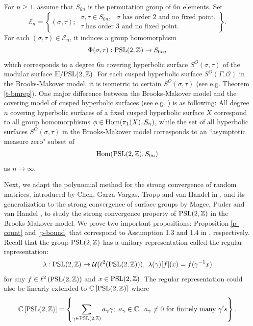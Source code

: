 \documentclass{amsart}
\theoremstyle{plain}
\theoremstyle{definition}
\theoremstyle{remark}
\begin{document}
For $n\geq 1$, assume that $S_{6n}$ is the permutation group of $6n$ elements. Set
$$\mathcal{E}_n=\left\{(\sigma,\tau);\ \begin{matrix}\sigma,\tau\in S_{6n},\text{ $\sigma$ has order $2$ and no fixed point,}\\ \text{$\tau$ has order $3$ and no fixed point}.\end{matrix}\right\}.$$
For each $(\sigma,\tau)\in\mathcal{E}_n$, it induces a group homomorphism
$$\Phi(\sigma,\tau):\textnormal{PSL}(2,\mathbb{Z})\to S_{6n},$$
which corresponds to a degree $6n$ covering hyperbolic surface $S^O(\sigma,\tau)$ of the modular surface $\mathbb{H}/\textnormal{PSL}(2,\mathbb{Z})$. For each cusped hyperbolic surface $S^O(\Gamma,\mathcal{O})$ in the Brooks-Makover model, it is isometric to certain $S^O(\sigma,\tau)$ (see e.g. Theorem \ref{t-bmrep}). One major difference between the Brooks-Makover model and the covering model of cusped hyperbolic surfaces (see e.g. \cite{HM23}) is as following: All degree $n$ covering hyperbolic surfaces of a fixed cusped hyperbolic surface $X$ correspond to all group homomorphisms $\phi\in\textnormal{Hom}(\pi_1(X),S_n)$, while the set of all hyperbolic surfaces $S^O(\sigma,\tau)$ in the Brooks-Makover model corresponds to an ``asymptotic measure zero" subset of $$\textnormal{Hom}(\textnormal{PSL}(2,\mathbb{Z}),S_{6n})$$ as $n\to\infty$.

Next, we adapt the polynomial method for the strong convergence of random matrices, introduced by Chen, Garza-Vargas, Tropp and van Handel in \cite{CGVTvH24}, and its generalization to the strong convergence of surface groups by Magee, Puder and van Handel \cite{MPvH25}, to study the strong convergence property of $\textnormal{PSL}(2,\mathbb{Z})$ in the Brooks-Makover model. We prove two important propositions: Proposition \ref{p-count} and \ref{p-bound} that correspond to Assumption 1.3 and 1.4 in \cite{MPvH25}, respectively. Recall that the group $\textnormal{PSL}(2,\mathbb{Z})$ has a unitary representation called the regular representation:
    $$\lambda:\textnormal{PSL}(2,\mathbb{Z})\to\mathcal{U}(\ell^2(\textnormal{PSL}(2,\mathbb{Z}))),\ \lambda(\gamma)[f](x)=f(\gamma^{-1}x)$$
    for any $f\in\ell^2\left(\textnormal{PSL}(2,\mathbb{Z})\right)$ and $x\in \textnormal{PSL}(2,\mathbb{Z})$.
    The regular representation could also be linearly extended to $\mathbb{C}\left[\textnormal{PSL}(2,\mathbb{Z})\right]$ where
    $$\mathbb{C}\left[\textnormal{PSL}(2,\mathbb{Z})\right]=\left\{\sum\limits_{\gamma\in\textnormal{PSL}(2,\mathbb{Z})}a_{\gamma}\gamma;\ a_\gamma\in\mathbb{C},\ a_{\gamma}\neq 0\text{ for finitely many }\gamma's\right\}.$$
   
\end{document}
